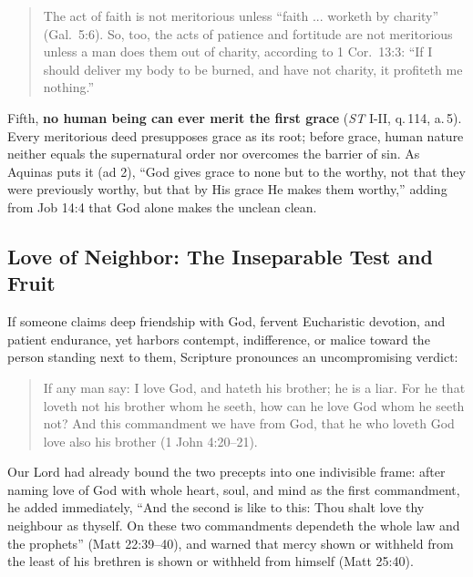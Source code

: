 \begin{quote}
The act of faith is not meritorious unless ``faith ... worketh by charity'' (Gal.\ 5:6). So, too, the acts of patience and fortitude are not meritorious unless a man does them out of charity, according to 1 Cor.\ 13:3: ``If I should deliver my body to be burned, and have not charity, it profiteth me nothing.''
\end{quote}

Fifth, \textbf{no human being can ever merit the first grace} (\emph{ST} I-II, q.\,114, a.\,5). Every meritorious deed presupposes grace as its root; before grace, human nature neither equals the supernatural order nor overcomes the barrier of sin. As Aquinas puts it (ad 2), ``God gives grace to none but to the worthy, not that they were previously worthy, but that by His grace He makes them worthy,'' adding from Job 14:4 that God alone makes the unclean clean.

\subsection*{Love of Neighbor: The Inseparable Test and Fruit}

If someone claims deep friendship with God, fervent Eucharistic devotion, and patient endurance, yet harbors contempt, indifference, or malice toward the person standing next to them, Scripture pronounces an uncompromising verdict:

\begin{quote}
If any man say: I love God, and hateth his brother; he is a liar. For he that loveth not his brother whom he seeth, how can he love God whom he seeth not? And this commandment we have from God, that he who loveth God love also his brother (1 John 4:20--21).
\end{quote}

Our Lord had already bound the two precepts into one indivisible frame: after naming love of God with whole heart, soul, and mind as the first commandment, he added immediately, ``And the second is like to this: Thou shalt love thy neighbour as thyself. On these two commandments dependeth the whole law and the prophets'' (Matt 22:39--40), and warned that mercy shown or withheld from the least of his brethren is shown or withheld from himself (Matt 25:40).

